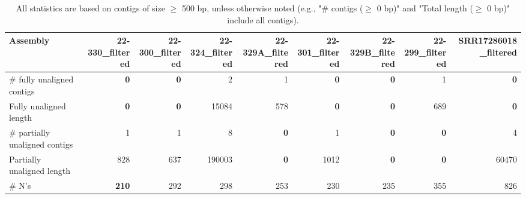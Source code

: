 \documentclass[12pt,a4paper]{article}
\begin{document}
\begin{table}[ht]
\begin{center}
\caption{All statistics are based on contigs of size $\geq$ 500 bp, unless otherwise noted (e.g., "\# contigs ($\geq$ 0 bp)" and "Total length ($\geq$ 0 bp)" include all contigs).}
\begin{tabular}{|l*{8}{|r}|}
\hline
Assembly & 22-330\_filtered & 22-300\_filtered & 22-324\_filtered & 22-329A\_filtered & 22-301\_filtered & 22-329B\_filtered & 22-299\_filtered & SRR17286018\_filtered \\ \hline
\# fully unaligned contigs & {\bf 0} & {\bf 0} & 2 & 1 & {\bf 0} & {\bf 0} & 1 & {\bf 0} \\ \hline
Fully unaligned length & {\bf 0} & {\bf 0} & 15084 & 578 & {\bf 0} & {\bf 0} & 689 & {\bf 0} \\ \hline
\# partially unaligned contigs & 1 & 1 & 8 & {\bf 0} & 1 & {\bf 0} & {\bf 0} & 4 \\ \hline
Partially unaligned length & 828 & 637 & 190003 & {\bf 0} & 1012 & {\bf 0} & {\bf 0} & 60470 \\ \hline
\# N's & {\bf 210} & 292 & 298 & 253 & 230 & 235 & 355 & 826 \\ \hline
\end{tabular}
\end{center}
\end{table}
\end{document}
